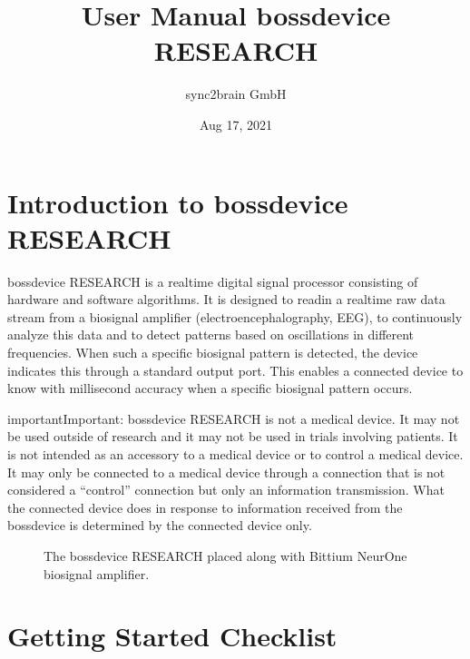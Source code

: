 \documentclass[letterpaper,10pt,english]{sphinxmanual}
\title{User Manual \sphinxhyphen{} bossdevice RESEARCH}
\date{Aug 17, 2021}
\author{sync2brain GmbH}
\begin{document}
\pagestyle{empty}
\sphinxmaketitle
\pagestyle{plain}
\sphinxtableofcontents
\pagestyle{normal}
\label{\detokenize{index::doc}}



\chapter{Introduction to bossdevice RESEARCH}
\label{\detokenize{1_introduction_to_bossdevice_research:introduction-to-bossdevice-research}}\label{\detokenize{1_introduction_to_bossdevice_research::doc}}
\sphinxAtStartPar
bossdevice RESEARCH is a real\sphinxhyphen{}time digital signal processor consisting of hardware and software algorithms. It is designed to read\sphinxhyphen{}in a real\sphinxhyphen{}time raw data stream from a biosignal amplifier (electroencephalography, EEG), to continuously analyze this data and to detect patterns based on oscillations in different frequencies. When such a specific bio\sphinxhyphen{}signal pattern is detected, the device indicates this through a standard output port. This enables a connected device to know with millisecond accuracy when a specific bio\sphinxhyphen{}signal pattern occurs.

\begin{sphinxadmonition}{important}{Important:}
\sphinxAtStartPar
bossdevice RESEARCH is not a medical device. It may not be used outside of research
and it may not be used in trials involving patients. It is not intended as an accessory
to a medical device or to control a medical device. It may only be connected to a
medical device through a connection that is not considered a “control” connection
but only an information transmission. What the connected device does in response
to information received from the bossdevice is determined by the connected device
only.
\end{sphinxadmonition}

\begin{figure}[htbp]
\centering
\capstart

\noindent{}
\caption{The bossdevice RESEARCH placed along with Bittium NeurOne biosignal amplifier.}\label{\detokenize{1_introduction_to_bossdevice_research:id1}}\end{figure}


\chapter{Getting Started \sphinxhyphen{} Checklist}
\label{\detokenize{1b_GettingStartedCheckList:getting-started-checklist}}\label{\detokenize{1b_GettingStartedCheckList::doc}}
\end{document}
